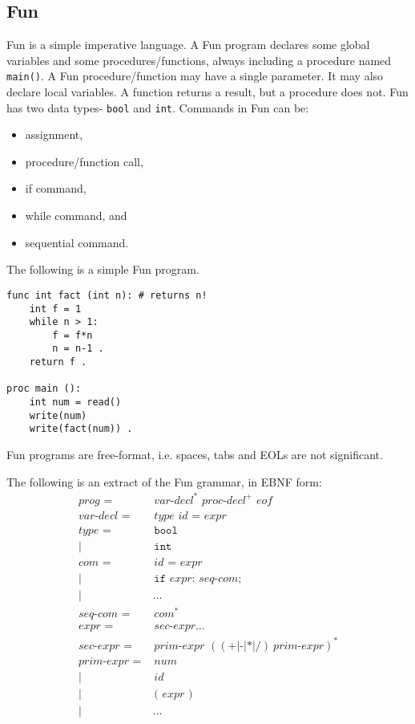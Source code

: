 \documentclass[a4paper, openany]{memoir}
\begin{document}
\subsection{Fun}
Fun is a simple imperative language. A Fun program declares some global variables and some procedures/functions, always including a procedure named \texttt{main()}. A Fun procedure/function may have a single parameter. It may also declare local variables. A function returns a result, but a procedure does not. Fun has two data types- \texttt{bool} and \texttt{int}. Commands in Fun can be:
\begin{itemize}
    \item assignment,
    \item procedure/function call,
    \item if command,
    \item while command, and
    \item sequential command.
\end{itemize}

The following is a simple Fun program.
\begin{lstlisting}[language=fun]
func int fact (int n): # returns n!
    int f = 1
    while n > 1:
        f = f*n
        n = n-1 .
    return f .

proc main ():
    int num = read()
    write(num)
    write(fact(num)) .
\end{lstlisting}
Fun programs are free-format, i.e. spaces, tabs and EOLs are not significant. 

The following is an extract of the Fun grammar, in EBNF form:
\begin{align*}
    \textit{prog } =& \textit{ var-decl}^* \textit{ proc-decl}^+ \textit{ eof} \\
    \textit{var-decl } =& \textit{ type id } \texttt{=} \textit{ expr} \\
    \textit{type } =& \texttt{ bool} \\
    |\hspace{2pt} & \texttt{ int} \\
    \textit{com } =& \textit{ id } \texttt{=} \textit{ expr} \\
    |\hspace{2pt} & \texttt{ if } \textit{expr} \texttt{:} \textit{ seq-com} \texttt{;} \\
    |\hspace{2pt} & \ \dots \\
    \textit{seq-com } =& \textit{ com}^* \\
    \textit{expr } =& \textit{ sec-expr} \dots \\
    \textit{sec-expr } =& \textit{ prim-expr } 
    ((\texttt{+} | \texttt{-} | \texttt{*} | \texttt{/}) \ \textit{prim-expr})^* \\
    \textit{prim-expr } =& \textit{ num} \\
    |\hspace{2pt} & \textit{ id} \\
    |\hspace{2pt} & \texttt{ ( } \textit{expr } \texttt{)} \\
    |\hspace{2pt} & \ \dots
\end{align*}
\end{document}
